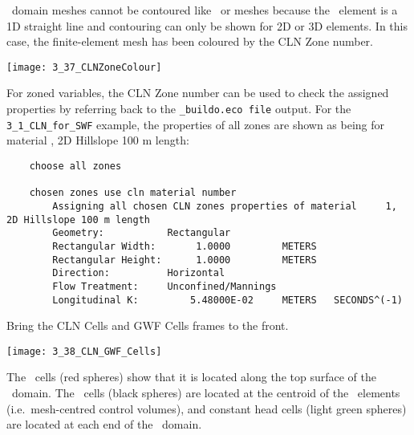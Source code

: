 \cln\ domain meshes cannot be contoured like \gwf\ or \swf meshes because the \cln\ element is a 1D straight line and contouring can only be shown for 2D or 3D elements.  In this case, the finite-element mesh has been coloured by the {\sf CLN Zone} number.

        \texttt{[image: 3\_37\_CLNZoneColour]}

For zoned variables, the {\sf CLN Zone} number can be used to check the assigned properties by referring back to the {\tt \_buildo.eco file} output.  For the {\tt 3\_1\_CLN\_for\_SWF} example, the properties of all zones are shown as being for material {, 2D Hillslope 100 m length}:
\begin{verbatim}
    choose all zones

    chosen zones use cln material number
    	Assigning all chosen CLN zones properties of material     1, 2D Hillslope 100 m length
    	Geometry:           Rectangular
    	Rectangular Width:       1.0000         METERS
    	Rectangular Height:      1.0000         METERS
    	Direction:          Horizontal
    	Flow Treatment:     Unconfined/Mannings
    	Longitudinal K:         5.48000E-02     METERS   SECONDS^(-1)
 \end{verbatim}

 Bring the {\sf CLN Cells} and {\sf GWF Cells} frames to the front.

        \texttt{[image: 3\_38\_CLN\_GWF\_Cells]}

The \cln\ cells (red spheres) show that it is located along the top surface of the \gwf\ domain.  The \gwf\ cells (black spheres) are located at the centroid of the \gwf\ elements (i.e.\ mesh-centred control volumes), and constant head cells (light green spheres) are located at each end of the \gwf\ domain.


